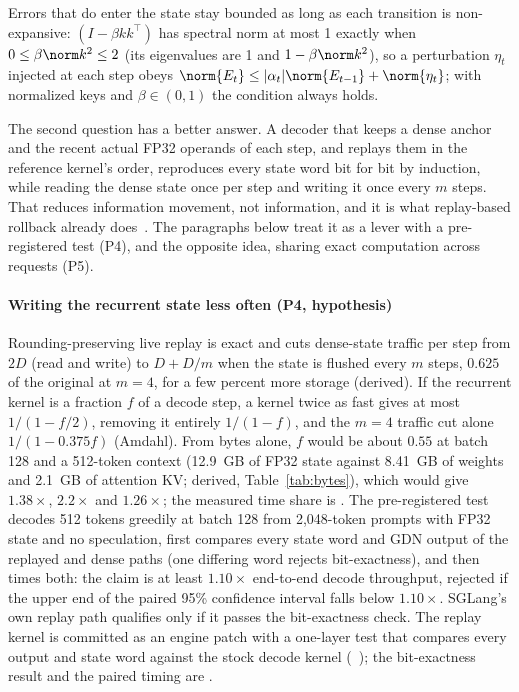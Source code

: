 Errors that do enter the state stay bounded as long as each transition is non-expansive: $(I-\beta kk^\top)$ has spectral norm at most 1 exactly when $0\le\beta\norm k^2\le2$ (its eigenvalues are 1 and $1-\beta\norm k^2$), so a perturbation $\eta_t$ injected at each step obeys $\norm{E_t}\le|\alpha_t|\norm{E_{t-1}}+\norm{\eta_t}$; with normalized keys and $\beta\in(0,1)$ the condition always holds.

The second question has a better answer. A decoder that keeps a dense anchor and the recent actual FP32 operands of each step, and replays them in the reference kernel's order, reproduces every state word bit for bit by induction, while reading the dense state once per step and writing it once every $m$ steps. That reduces information movement, not information, and it is what replay-based rollback already does~\cite{replayssm,gdncode}. The paragraphs below treat it as a lever with a pre-registered test (P4), and the opposite idea, sharing exact computation across requests (P5).

\paragraph{Writing the recurrent state less often (P4, hypothesis)} Rounding-preserving live replay is exact and cuts dense-state traffic per step from $2D$ (read and write) to $D+D/m$ when the state is flushed every $m$ steps, $0.625$ of the original at $m=4$, for a few percent more storage (derived). If the recurrent kernel is a fraction $f$ of a decode step, a kernel twice as fast gives at most $1/(1-f/2)$, removing it entirely $1/(1-f)$, and the $m=4$ traffic cut alone $1/(1-0.375f)$ (Amdahl). From bytes alone, $f$ would be about $0.55$ at batch 128 and a 512-token context (12.9~GB of FP32 state against 8.41~GB of weights and 2.1~GB of attention KV; derived, Table~\ref{tab:bytes}), which would give $1.38\times$, $2.2\times$ and $1.26\times$; the measured time share is . The pre-registered test decodes 512 tokens greedily at batch 128 from 2,048-token prompts with FP32 state and no speculation, first compares every state word and GDN output of the replayed and dense paths (one differing word rejects bit-exactness), and then times both: the claim is at least $1.10\times$ end-to-end decode throughput, rejected if the upper end of the paired 95\% confidence interval falls below $1.10\times$. SGLang's own replay path qualifies only if it passes the bit-exactness check. The replay kernel is committed as an engine patch with a one-layer test that compares every output and state word against the stock decode kernel (~); the bit-exactness result and the paired timing are .

